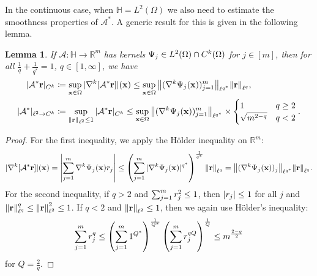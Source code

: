 \documentclass[10pt,a4paper,onecolumn]{article}
\numberwithin{equation}{section}
\newtheorem{lemma}{Lemma}[section]\newtheorem{example}{Example}[section]
\let\F\mathds\let\C\mathcal\newcommand{\R}{\F{R}}\newcommand{\A}{\C{A}}
\newcommand{\norm}[1]{{\left\lVert #1 \right\rVert}}
\newcommand{\splitln}[4]{\begin{cases} #1 & #2 \\ #3 & #4\end{cases}}
\renewcommand{\vec}{\mathbf}
\newcommand{\UCmath}[1]{%
	\begingroup
	\ucmathlist\uppercase\expandafter{#1}%
	\endgroup
}
\newcommand{\ucmathlist}{%
	\def\alpha{\mathrm{A}}%
	\def\beta{\mathrm{B}}%
	\let\gamma=\Gamma
	\let\delta=\Delta
	\def\epsilon{\mathrm{E}}%
	\def\varepsilon{\mathrm{E}}%
	\def\zeta{\mathrm{Z}}%
	\def\eta{\mathrm{H}}%
	\let\theta=\Theta
	\let\vartheta=\Theta
	\def\iota{\mathrm{I}}%
	\def\kappa{\mathrm{K}}%
	\let\lambda=\Lambda
	\def\mu{\mathrm{M}}%
	\def\nu{\mathrm{N}}%
	\let\xi=\Xi
	\let\pi=\Pi
	\let\varpi=\Pi
	\def\rho{\mathrm{P}}%
	\def\varrho{\mathrm{P}}%
	\let\sigma=\Sigma
	\def\tau{\mathrm{T}}%
	\let\upsilon=\Upsilon
	\let\phi=\Phi
	\let\varphi=\Phi
	\def\chi{\mathrm{X}}%
	\let\psi=\Psi
	\let\omega=\Omega
}
\newcommand{\caps}[1]{\UCmath{#1}}
\newcommand*{\vard}[1]{%
	\IfEqCase{#1}{%
		{0}{\varphi}%
		{1}{\psi}%
	}[\varphi #1]%
}
\newcommand*{\varx}[1]{%
	\IfEqCase{#1}{%
		{0}{x}%
		{1}{y}%
		{2}{z}%
		{3}{r}%
	}[x#1]%
}
\newcommand{\Domain}{\Omega}
\newcommand*{\Varx}[1]{\caps{\varx{#1}}}
\newcommand*{\vvarx}[1]{\vec{\varx{#1}}}\newcommand*{\vVarx}[1]{\vec{\Varx{#1}}}
\begin{document}
In the continuous case, when $\F H=L^2(\Domain)$ we also need to estimate the smoothness properties of $\A^*$. A generic result for this is given in the following lemma.
\begin{lemma}\label{thm:ca: norm bound smoothness}
	If $\A\colon \F H \to \R^m$ has kernels $\vard1_j\in L^2(\Domain)\cap C^k(\Domain)$ for $j\in[m]$, then for all $\frac1q+\frac1{q^*}=1$, $q\in[1,\infty]$, we have
	\begin{align*}
		|\A^*\vvarx3|_{C^k}&\coloneqq \sup_{\vvarx0\in\Domain} |\nabla^k[\A^*\vvarx3]|(\vvarx0) \leq \sup_{\vvarx0\in\Domain}\norm{(\nabla^k\vard1_j(\vvarx0))_{j=1}^m}_{\ell^{q^*}}\norm{\vvarx3}_{\ell^q},
		\\ |\A^*|_{\ell^2\to C^k}&\coloneqq \sup_{\norm{\vvarx3}_{\ell^2}\leq 1} |\A^*\vvarx3|_{C^k} \leq \sup_{\vvarx0\in\Domain}\norm{(\nabla^k\vard1_j(\vvarx0))_{j=1}^m}_{\ell^{q^*}}\times \splitln{1}{q\geq 2}{\sqrt{m^{2-q}}}{q<2}.
	\end{align*}
\end{lemma}
\begin{proof}
	For the first inequality, we apply the H\"older inequality on $\R^m$:
	$$ |\nabla^k[\A^*\vvarx3]|(\vvarx0) = \left|\sum_{j=1}^m\nabla^k\vard1_j(\vvarx0)\varx3_j\right|
	\leq \left(\sum_{j=1}^m|\nabla^k\vard1_j(\vvarx0)|^{q^*}\right)^{\frac{1}{q^*}}\norm{\vvarx3}_{\ell^q} = \norm{(\nabla^k\vard1_j(\vvarx0))_j}_{\ell^{q^*}}\norm{\vvarx3}_{\ell^q}.$$
	For the second inequality, if $q>2$ and $\sum_{j=1}^m \varx3_j^2\leq 1$, then $|\varx3_j|\leq 1$ for all $j$ and $\norm{\vvarx3}_{\ell^q}^q\leq \norm{\vvarx3}_{\ell^2}^2\leq 1$. If $q<2$ and $\norm{\vvarx3}_{\ell^2}\leq 1$, then we again use H\"older's inequality:
	$$\sum_{j=1}^m \varx3_j^q \leq \left(\sum_{j=1}^m 1^{Q^*}\right)^{\frac1{Q^*}} \left(\sum_{j=1}^m \varx3_j^{qQ}\right)^{\frac1{Q}} \leq m^{\frac{2-q}{2}}$$
	for $Q = \frac2q$.
\end{proof}
\end{document}
